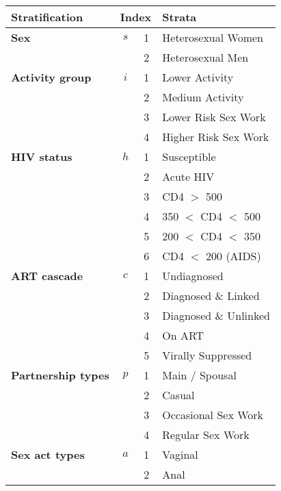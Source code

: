 \begin{tabular}{lccl}
  \toprule
  Stratification & \multicolumn{2}{c}{Index} & Strata          \\
  \midrule
  \textbf{Sex}               & $s$ & 1 & Heterosexual Women    \\
                             &     & 2 & Heterosexual Men      \\[1ex]
  \textbf{Activity group}    & $i$ & 1 & Lower Activity        \\
                             &     & 2 & Medium Activity       \\
                             &     & 3 & Lower Risk Sex Work   \\
                             &     & 4 & Higher Risk Sex Work  \\[1ex]
  \textbf{HIV status}        & $h$ & 1 & Susceptible           \\
                             &     & 2 & Acute HIV             \\
                             &     & 3 & CD4 $>$ 500           \\
                             &     & 4 & 350 $<$ CD4 $<$ 500   \\
                             &     & 5 & 200 $<$ CD4 $<$ 350   \\
                             &     & 6 & CD4 $<$ 200 (AIDS)    \\[1ex]
  \textbf{ART cascade}       & $c$ & 1 & Undiagnosed           \\
                             &     & 2 & Diagnosed \& Linked   \\
                             &     & 3 & Diagnosed \& Unlinked \\
                             &     & 4 & On ART                \\
                             &     & 5 & Virally Suppressed    \\
  \midrule
  \textbf{Partnership types} & $p$ & 1 & Main / Spousal        \\
                             &     & 2 & Casual                \\
                             &     & 3 & Occasional Sex Work   \\
                             &     & 4 & Regular Sex Work      \\[1ex]
  \textbf{Sex act types}     & $a$ & 1 & Vaginal               \\
                             &     & 2 & Anal                  \\
  \bottomrule
\end{tabular}